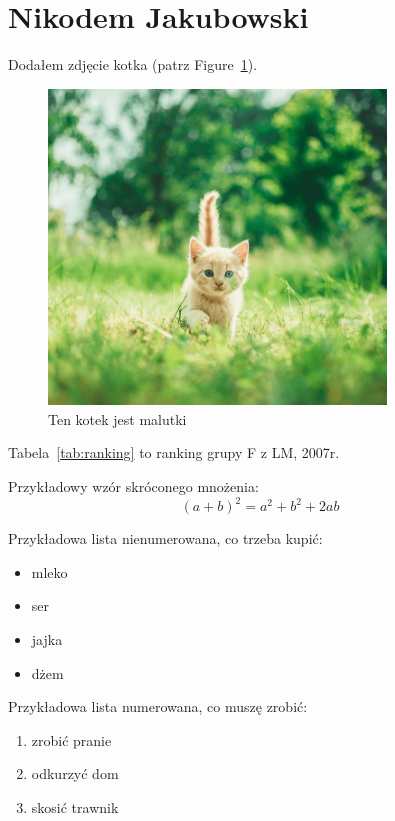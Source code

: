 \newpage
\section{Nikodem Jakubowski}
\label{sec:pawljmlo}

\begin{center}
{\Large Dodałem zdjęcie kotka} (patrz Figure~\ref{fig:kotek}).
\end{center}


\begin{figure}[htbp] %
    \centering
    \includegraphics[width=0.8\textwidth]{pictures/kotek.png} %
    \caption{Ten kotek jest malutki}
    \label{fig:kotek}
\end{figure}

{\Large Tabela~\ref{tab:ranking} to ranking grupy F z LM, 2007r.} %



{\Large Przykładowy wzór skróconego mnożenia:
 \[(a+b)^2=a^2 + b^2 + 2ab\]}
\newpage 

 {\Large Przykładowa lista nienumerowana, co trzeba kupić:
\begin{itemize}
  \item mleko
  \item ser
  \item jajka
  \item dżem
\end{itemize}
\newline


Przykładowa lista numerowana, co muszę zrobić:
\begin{enumerate}
  \item zrobić pranie
  \item odkurzyć dom
  \item skosić trawnik
\end{enumerate}
}

